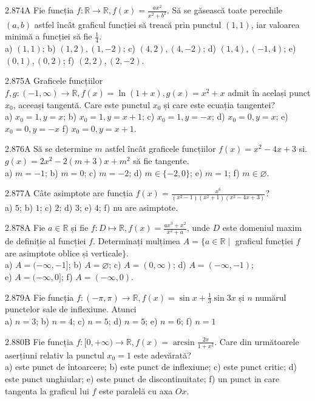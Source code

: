 \documentclass[11pt]{article}
\begin{document}
2.874A Fie funcția $f: \mathbb{R} \rightarrow \mathbb{R}, f(x)=\frac{a x^{2}}{x^{2}+b^{2}}$. Să se găsească toate perechile $(a,b)$ astfel încât graficul funcției să treacă prin punctul $(1,1)$, iar valoarea minimă a funcției să fie $\frac{1}{4}$.\\ a) $(1,1)$; b) $(1,2),(1,-2)$; c) $(4,2),(4,-2)$; d) $(1,4),(-1,4)$; e) $(0,1),(0,2)$; f) $(2,2),(2,-2)$.

2.875A Graficele funcțiilor $f, g:(-1, \infty) \rightarrow \mathbb{R}, f(x)=\ln (1+x), g(x)=x^{2}+x$ admit în același punct $x_{0}$, aceeași tangentă. Care este punctul $x_{0}$ și care este ecuația tangentei?\\ a) $x_{0}=1, y=x$; b) $x_{0}=1, y=x+1$; c) $x_{0}=1, y=-x$; d) $x_{0}=0, y=x$; e) $x_{0}=0, y=-x$ f) $x_{0}=0, y=x+1$.

2.876A Să se determine $m$ astfel încât graficele funcțiilor $f(x)=x^{2}-4 x+3$ si. $g(x)=2 x^{2}-2(m+3) x+m^{2}$ să fie tangente.\\ a) $m=-1$; b) $m=0$; c) $m=-2$; d) $m \in\{-2,0\}$; e) $m=1$; f) $m \in \varnothing$.

2.877A Câte asimptote are funcția $f(x)=\frac{x^{6}}{\left(x^{2}-1\right)\left(x^{2}+1\right)\left(x^{2}-4 x+3\right)}$?\\ a) $5$; b) $1$; c) $2$; d) $3$; e) $4$; f) nu are asimptote.

2.878A Fie $a \in \mathbb{R}$ și fie $f: D \mapsto \mathbb{R}, f(x)=\frac{a x^{3}+x^{2}}{x^{2}+a}$, unde $D$ este domeniul maxim de definiție al funcției $f$. Determinați mulțimea $A=\{a \in \mathbb{R} \mid$ graficul funcției $f$ are asimptote oblice și verticale$\}$.\\ a) $A=(-\infty,-1]$; b) $A=\varnothing$; c) $A=(0, \infty)$; d) $A=(-\infty,-1)$;\\ e) $A=(-\infty, 0]$; f) $A=(-\infty, 0)$.

2.879A Fie funcția $f:(-\pi, \pi) \rightarrow \mathbb{R}, f(x)=\sin x+\frac{1}{3} \sin 3 x$ și $n$ numărul punctelor sale de inflexiune. Atunci\\ a) $n=3$; b) $n=4$; c) $n=5$; d) $n=5$; e) $n=6$; f) $n=1$ 

2.880B Fie funcția $f:[0,+\infty) \rightarrow \mathbb{R}, f(x)=\arcsin \frac{2 x}{1+x^{2}}$. Care din următoarele aserțiuni relativ la punctul $x_{0}=1$ este adevărată?\\ a) este punct de întoarcere; b) este punct de inflexiune; c) este punct critic; d) este punct unghiular; e) este punct de discontinuitate; f) un punct in care tangenta la graficul lui $f$ este paralelă cu axa $O x$.
\end{document}
